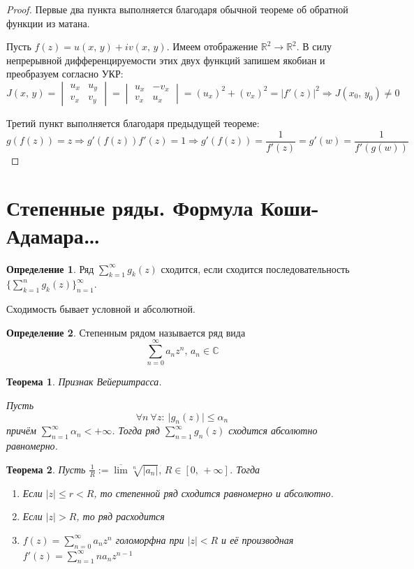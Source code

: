 \documentclass[a4paper,12pt]{article}
\renewcommand{\leq}{\ensuremath{\leqslant}}
\theoremstyle{plain}
\newtheorem{theorem}{Теорема}[section]
\theoremstyle{definition}
\newtheorem{definition}{Определение}[section]
\theoremstyle{remark}
\begin{document}
\begin{proof}
	Первые два пункта выполняется благодаря обычной теореме об обратной функции из матана.

	Пусть $f(z) = u(x,\,y) + iv(x,\,y)$. Имеем отображение $\mathbb{R}^2 \to \mathbb{R}^2$. В силу непрерывной дифференцируемости этих двух функций запишем якобиан и преобразуем согласно УКР:
	\[
		J(x,\,y) = \begin{vmatrix}
			u_x & u_y \\
			v_x & v_y
		\end{vmatrix} = \begin{vmatrix}
			u_x & -v_x \\
			v_x & u_x
		\end{vmatrix} = (u_x)^2 + (v_x)^2 = \vert f'(z)\vert^2 \Rightarrow J(x_0,\, y_0) \neq 0
	\]

	Третий пункт выполняется благодаря предыдущей теореме:
	\[
		g(f(z)) = z \Rightarrow g'(f(z))f'(z) = 1 \Rightarrow g'(f(z)) = \frac{1}{f'(z)} = g'(w) = \frac{1}{f'(g(w))}
	\]
\end{proof}

\section{Степенные ряды. Формула Коши-Адамара\dots}
\begin{definition}
	Ряд $\sum_{k = 1}^\infty g_k(z)$ сходится, если сходится последовательность $\{\sum_{k=1}^n g_k(z)\}_{n = 1}^\infty$.

	Сходимость бывает условной и абсолютной.
\end{definition}

\begin{definition}
	Степенным рядом называется ряд вида
	\[
		\sum_{n = 0}^\infty a_nz^n,\, a_n \in \mathbb{C}
	\]
\end{definition}

\begin{theorem}
	Признак Вейерштрасса.

	Пусть
	\[
		\forall n \: \forall z:\: \vert g_n(z)\vert \leq \alpha_n
	\]
	причём $\sum_{n = 1}^\infty \alpha_n < +\infty$. Тогда ряд $\sum_{n = 1}^\infty g_n(z)$ сходится абсолютно равномерно.
\end{theorem}

\begin{theorem}
	Пусть $\frac{1}{R} := \overline{\lim}\sqrt[n]{\vert a_n\vert},\, R \in [0,\, +\infty]$. Тогда
	\begin{enumerate}
		\item Если $\vert z\vert \leq r < R$, то степенной ряд сходится равномерно и абсолютно.
		\item Если $\vert z\vert > R$, то ряд расходится
		\item $f(z) = \sum_{n = 0}^\infty a_nz^n$ голоморфна при $\vert z\vert < R$ и её производная $f'(z) = \sum_{n = 1}^\infty na_nz^{n-1}$
	\end{enumerate}
\end{theorem}
\end{document}
